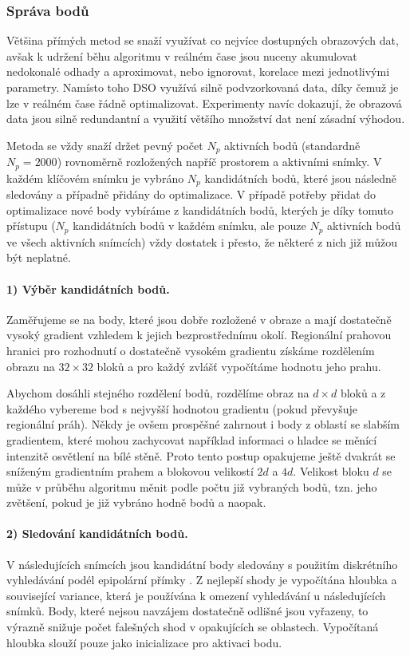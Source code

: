 \documentclass[12pt,a4paper]{article}
\begin{document}
\subsubsection*{Správa bodů}
Většina přímých metod se snaží využívat co nejvíce dostupných obrazových dat, avšak k udržení běhu algoritmu v reálném čase jsou nuceny akumulovat nedokonalé odhady a aproximovat, nebo ignorovat, korelace mezi jednotlivými parametry. Namísto toho DSO využívá silně podvzorkovaná data, díky čemuž je lze v reálném čase řádně optimalizovat. Experimenty navíc dokazují, že obrazová data jsou silně redundantní a využití většího množství dat není zásadní výhodou. 

Metoda se vždy snaží držet pevný počet \( N_p \) aktivních bodů (standardně \( N_p = 2000 \)) rovnoměrně rozložených napříč prostorem a aktivními snímky. V každém klíčovém snímku je vybráno \( N_p \) kandidátních bodů, které jsou následně sledovány a případně přidány do optimalizace. V případě potřeby přidat do optimalizace nové body vybíráme z kandidátních bodů, kterých je díky tomuto přístupu (\( N_p \) kandidátních bodů v každém snímku, ale pouze \( N_p \) aktivních bodů ve všech aktivních snímcích) vždy dostatek i přesto, že některé z nich již můžou být neplatné.

\paragraph*{1) Výběr kandidátních bodů.} Zaměřujeme se na body, které jsou dobře rozložené v obraze a mají dostatečně vysoký gradient vzhledem k jejich bezprostřednímu okolí. Regionální prahovou hranici pro rozhodnutí o dostatečně vysokém gradientu získáme rozdělením obrazu na \( 32 \times 32 \) bloků a pro každý zvlášť vypočítáme hodnotu jeho prahu.

Abychom dosáhli stejného rozdělení bodů, rozdělíme obraz na \( d \times d \) bloků a z každého vybereme bod s nejvyšší hodnotou gradientu (pokud převyšuje regionální práh). Někdy je ovšem prospěšné zahrnout i body z oblastí se slabším gradientem, které mohou zachycovat například informaci o hladce se měnící intenzitě osvětlení na bílé stěně. Proto tento postup opakujeme ještě dvakrát se sníženým gradientním prahem a blokovou velikostí \( 2d \) a \( 4d \). Velikost bloku \( d \) se může v průběhu algoritmu měnit podle počtu již vybraných bodů, tzn. jeho zvětšení, pokud je již vybráno hodně bodů a naopak.

\paragraph*{2) Sledování kandidátních bodů.} V následujících snímcích jsou kandidátní body sledovány s použitím diskrétního vyhledávání podél epipolární přímky \cite{Engel2018_DSO}. Z nejlepší shody je vypočítána hloubka a související variance, která je používána k omezení vyhledávání u následujících snímků. Body, které nejsou navzájem dostatečně odlišné jsou vyřazeny, to výrazně snižuje počet falešných shod v opakujících se oblastech. Vypočítaná hloubka slouží pouze jako inicializace pro aktivaci bodu.
\end{document}

